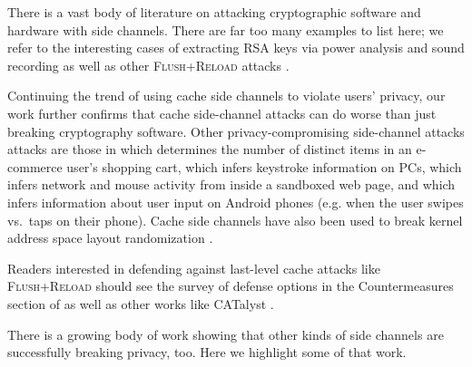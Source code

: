 \documentclass[letterpaper,twocolumn,10pt]{article}
\begin{document}
There is a vast body of literature on attacking cryptographic software and
hardware with side channels. There are far too many examples to list here; we
refer to the interesting cases of extracting RSA keys via power analysis
\cite{messerges1999power} and sound recording \cite{genkin2013rsa} as well as
other \textsc{Flush+Reload} attacks \cite{yarom2013flush, benger2014ooh,
yarom2014recovering}.

Continuing the trend of using cache side channels to violate users' privacy, our
work further confirms that cache side-channel attacks can do worse than just
breaking cryptography software. Other privacy-compromising side-channel attacks
attacks are those in \cite{zhang2014cross} which determines the number of
distinct items in an e-commerce user's shopping cart, \cite{gruss2015cache}
which infers keystroke information on PCs, \cite{oren2015spy} which infers
network and mouse activity from inside a sandboxed web page, and
\cite{lipp2015armageddon} which infers information about user input on Android
phones (e.g. when the user swipes vs.\ taps on their phone).  Cache side
channels have also been used to break kernel address space layout randomization
\cite{hund2013practical}.

Readers interested in defending against last-level cache attacks like
\textsc{Flush+Reload} should see the survey of defense options in the
Countermeasures section of \cite{gruss2015cache} as well as other works like
CATalyst \cite{liu2016catalyst}.

There is a growing body of work showing that other kinds of side channels are
successfully breaking privacy, too. Here we highlight some of that work.
\end{document}
